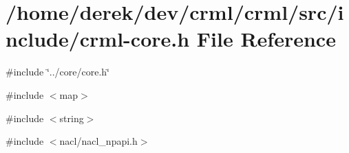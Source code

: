 \hypertarget{crml-core_8h}{
\section{/home/derek/dev/crml/crml/src/include/crml-\/core.h File Reference}
\label{crml-core_8h}
}
{\ttfamily \#include \char`\"{}../core/core.h\char`\"{}}\par
{\ttfamily \#include $<$map$>$}\par
{\ttfamily \#include $<$string$>$}\par
{\ttfamily \#include $<$nacl/nacl\_\-npapi.h$>$}\par
